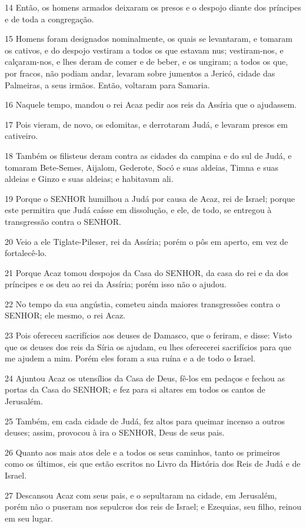 \par 14 Então, os homens armados deixaram os presos e o despojo diante dos príncipes e de toda a congregação.
\par 15 Homens foram designados nominalmente, os quais se levantaram, e tomaram os cativos, e do despojo vestiram a todos os que estavam nus; vestiram-nos, e calçaram-nos, e lhes deram de comer e de beber, e os ungiram; a todos os que, por fracos, não podiam andar, levaram sobre jumentos a Jericó, cidade das Palmeiras, a seus irmãos. Então, voltaram para Samaria.
\par 16 Naquele tempo, mandou o rei Acaz pedir aos reis da Assíria que o ajudassem.
\par 17 Pois vieram, de novo, os edomitas, e derrotaram Judá, e levaram presos em cativeiro.
\par 18 Também os filisteus deram contra as cidades da campina e do sul de Judá, e tomaram Bete-Semes, Aijalom, Gederote, Socó e suas aldeias, Timna e suas aldeias e Ginzo e suas aldeias; e habitavam ali.
\par 19 Porque o SENHOR humilhou a Judá por causa de Acaz, rei de Israel; porque este permitira que Judá caísse em dissolução, e ele, de todo, se entregou à transgressão contra o SENHOR.
\par 20 Veio a ele Tiglate-Pileser, rei da Assíria; porém o pôs em aperto, em vez de fortalecê-lo.
\par 21 Porque Acaz tomou despojos da Casa do SENHOR, da casa do rei e da dos príncipes e os deu ao rei da Assíria; porém isso não o ajudou.
\par 22 No tempo da sua angústia, cometeu ainda maiores transgressões contra o SENHOR; ele mesmo, o rei Acaz.
\par 23 Pois ofereceu sacrifícios aos deuses de Damasco, que o feriram, e disse: Visto que os deuses dos reis da Síria os ajudam, eu lhes oferecerei sacrifícios para que me ajudem a mim. Porém eles foram a sua ruína e a de todo o Israel.
\par 24 Ajuntou Acaz os utensílios da Casa de Deus, fê-los em pedaços e fechou as portas da Casa do SENHOR; e fez para si altares em todos os cantos de Jerusalém.
\par 25 Também, em cada cidade de Judá, fez altos para queimar incenso a outros deuses; assim, provocou à ira o SENHOR, Deus de seus pais.
\par 26 Quanto aos mais atos dele e a todos os seus caminhos, tanto os primeiros como os últimos, eis que estão escritos no Livro da História dos Reis de Judá e de Israel.
\par 27 Descansou Acaz com seus pais, e o sepultaram na cidade, em Jerusalém, porém não o puseram nos sepulcros dos reis de Israel; e Ezequias, seu filho, reinou em seu lugar.

